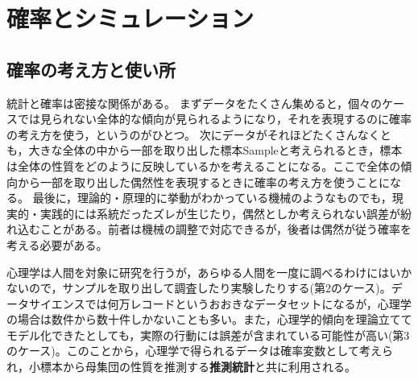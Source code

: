 \documentclass[
  a4paper,
]{ltjsbook}
\begin{document}

\chapter{確率とシミュレーション}\label{ux78baux7387ux3068ux30b7ux30dfux30e5ux30ecux30fcux30b7ux30e7ux30f3}

\section{確率の考え方と使い所}\label{ux78baux7387ux306eux8003ux3048ux65b9ux3068ux4f7fux3044ux6240}

統計と確率は密接な関係がある。
まずデータをたくさん集めると，個々のケースでは見られない全体的な傾向が見られるようになり，それを表現するのに確率の考え方を使う，というのがひとつ。
次にデータがそれほどたくさんなくとも，大きな全体の中から一部を取り出した標本Sampleと考えられるとき，標本は全体の性質をどのように反映しているかを考えることになる。ここで全体の傾向から一部を取り出した偶然性を表現するときに確率の考え方を使うことになる。
最後に，理論的・原理的に挙動がわかっている機械のようなものでも，現実的・実践的には系統だったズレが生じたり，偶然としか考えられない誤差が紛れ込むことがある。前者は機械の調整で対応できるが，後者は偶然が従う確率を考える必要がある。

心理学は人間を対象に研究を行うが，あらゆる人間を一度に調べるわけにはいかないので，サンプルを取り出して調査したり実験したりする(第2のケース)。データサイエンスでは何万レコードというおおきなデータセットになるが，心理学の場合は数件から数十件しかないことも多い。また，心理学的傾向を理論立ててモデル化できたとしても，実際の行動には誤差が含まれている可能性が高い(第3のケース)。このことから，心理学で得られるデータは確率変数として考えられ，小標本から母集団の性質を推測する\textbf{推測統計}と共に利用される。
\end{document}
